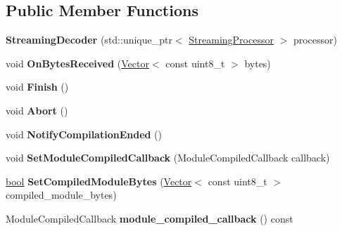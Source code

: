 \subsection*{Public Member Functions}
\begin{DoxyCompactItemize}
\item 
\mbox{\label{classv8_1_1internal_1_1wasm_1_1StreamingDecoder_aab83f7ab2d78c42910f09f873207a55e}} 
{\bfseries Streaming\+Decoder} (std\+::unique\+\_\+ptr$<$ \mbox{\hyperlink{classv8_1_1internal_1_1wasm_1_1StreamingProcessor}{Streaming\+Processor}} $>$ processor)
\item 
\mbox{\label{classv8_1_1internal_1_1wasm_1_1StreamingDecoder_a87150dba32a98fbe7b21f3ee2fcf7807}} 
void {\bfseries On\+Bytes\+Received} (\mbox{\hyperlink{classv8_1_1internal_1_1Vector}{Vector}}$<$ const uint8\+\_\+t $>$ bytes)
\item 
\mbox{\label{classv8_1_1internal_1_1wasm_1_1StreamingDecoder_a58fc1dd707ae7bb14177d7fbf6eb72ab}} 
void {\bfseries Finish} ()
\item 
\mbox{\label{classv8_1_1internal_1_1wasm_1_1StreamingDecoder_a6b698d899e5420033d48dee9b75fe502}} 
void {\bfseries Abort} ()
\item 
\mbox{\label{classv8_1_1internal_1_1wasm_1_1StreamingDecoder_ac5668a0c723d472cf0792f40b6b3f55f}} 
void {\bfseries Notify\+Compilation\+Ended} ()
\item 
\mbox{\label{classv8_1_1internal_1_1wasm_1_1StreamingDecoder_a7b6bf8180a9b7acb131c061c8ab2135f}} 
void {\bfseries Set\+Module\+Compiled\+Callback} (Module\+Compiled\+Callback callback)
\item 
\mbox{\label{classv8_1_1internal_1_1wasm_1_1StreamingDecoder_a6b187932bb49d00d6fb687580cec8572}} 
\mbox{\hyperlink{classbool}{bool}} {\bfseries Set\+Compiled\+Module\+Bytes} (\mbox{\hyperlink{classv8_1_1internal_1_1Vector}{Vector}}$<$ const uint8\+\_\+t $>$ compiled\+\_\+module\+\_\+bytes)
\item 
\mbox{\label{classv8_1_1internal_1_1wasm_1_1StreamingDecoder_a94e998848cc55448c404fc0650c74f59}} 
Module\+Compiled\+Callback {\bfseries module\+\_\+compiled\+\_\+callback} () const
\end{DoxyCompactItemize}


